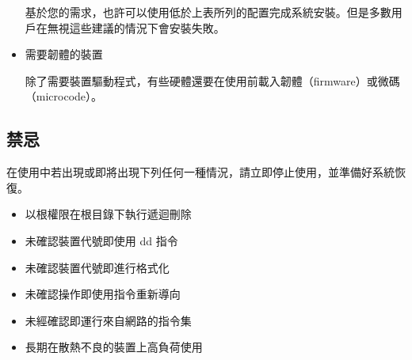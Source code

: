 \documentclass{article}
\begin{document}
\begin{multicols*}{3}
\begin{itemize}[leftmargin=*]
		基於您的需求，也許可以使用低於上表所列的配置完成系統安裝。但是多數用戶在無視這些建議的情況下會安裝失敗。

		\item 需要韌體的裝置

		除了需要裝置驅動程式，有些硬體還要在使用前載入韌體（firmware）或微碼（microcode）。

	\end{itemize}


	\begin{tcolorbox}
	\section*{禁忌}
	\end{tcolorbox}

	在使用中若出現或即將出現下列任何一種情況，請立即停止使用，並準備好系統恢復。

	\begin{itemize}[leftmargin=*]
		\setlength{\itemsep}{0pt}
		\setlength{\parskip}{0pt}
		\setlength{\parsep}{0pt}

		\item 以根權限在根目錄下執行遞迴刪除
		\item 未確認裝置代號即使用 dd 指令
		\item 未確認裝置代號即進行格式化
		\item 未確認操作即使用指令重新導向
		\item 未經確認即運行來自網路的指令集
		\item 長期在散熱不良的裝置上高負荷使用
	\end{itemize}


	 





\end{multicols*}
\end{document}
